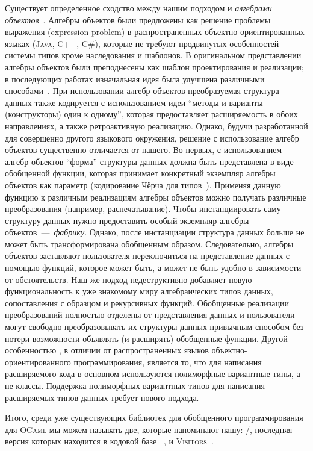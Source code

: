 Существует определенное сходство между нашим подходом и \emph{алгебрами объектов}~\cite{ObjectAlgebras}. Алгебры объектов были предложены как решение проблемы выражения (expression problem) в распространенных объектно-ориентированных языках  (\textsc{Java}, \textsc{C++}, \textsc{C\#}), которые не требуют продвинутых особенностей системы типов кроме наследования и шаблонов. В оригинальном представлении алгебры объектов были преподнесены как шаблон проектирования и реализации; в последующих работах изначальная идея была улучшена различными способами~\cite{ObjectAlgebrasAttribute,ObjectAlgebrasSYB}. При использовании алгебр объектов преобразуемая структура данных также кодируется с использованием идеи ``методы и варианты (конструкторы) один к одному'', которая предоставляет расширяемость в обоих направлениях, а также ретроактивную реализацию. Однако, будучи  разработанной для совершенно другого языкового окружения, решение с использование алгебр объектов существенно отличается от нашего. Во-первых, с использованием алгебр объектов ``форма'' структуры данных должна быть представлена в виде обобщенной функции, которая принимает конкретный экземпляр алгебры объектов как параметр (кодирование Чёрча для типов~\cite{Hinze}). Применяя данную функцию к различным реализациям алгебры объектов можно получать различные преобразования (например, распечатывание). Чтобы инстанциировать саму структуру данных нужно предоставить особый экземпляр алгебры объектов~---~\emph{фабрику}. Однако, после инстанциации структура данных больше не может быть трансформирована обобщенным образом. Следовательно, алгебры объектов заставляют пользователя переключиться на представление данных с помощью функций, которое может быть, а может не быть удобно в зависимости от обстоятельств.  Наш же подход недеструктивно добавляет новую функциональность к уже знакомому миру алгебраических типов данных, сопоставления с образцом и рекурсивных функций. Обобщенные реализации преобразований полностью отделены от представления данных и пользователи могут свободно преобразовывать их структуры данных привычным способом  без потери возможности объявлять (и расширять) обобщенные функции. Другой особенностью \ocaml, в отличии от распространенных языков объектно-ориентированного программирования, является то, что для написания расширяемого кода в основном используются полиморфные вариантные типы, а не классы. Поддержка полиморфных вариантных типов для написания расширяемых типов данных требует нового подхода.


Итого, среди уже существующих библиотек для обобщенного программирования для \textsc{OCaml} мы можем называть две, которые напоминают нашу: /, последняя версия которых находится в кодовой базе ~\cite{PPXLib}, и \textsc{Visitors}~\cite{Visitors}.

